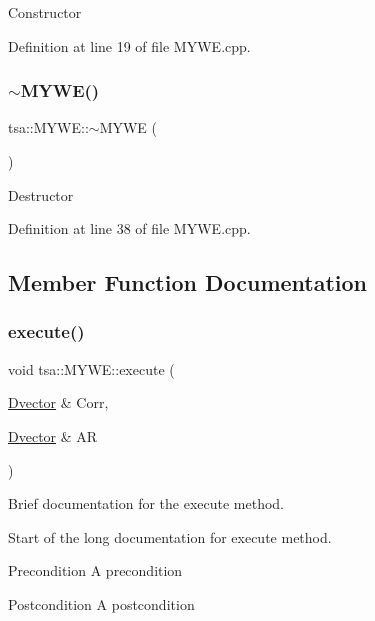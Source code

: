 Constructor 

Definition at line 19 of file M\+Y\+W\+E.\+cpp.

\mbox{\label{classtsa_1_1_m_y_w_e_a1bfa6dd78320a8606653346e2125e96a}} 
\subsubsection{\texorpdfstring{$\sim$\+M\+Y\+W\+E()}{~MYWE()}}
{\footnotesize\ttfamily tsa\+::\+M\+Y\+W\+E\+::$\sim$\+M\+Y\+WE (\begin{DoxyParamCaption}{ }\end{DoxyParamCaption})}

Destructor 

Definition at line 38 of file M\+Y\+W\+E.\+cpp.



\subsection{Member Function Documentation}
\mbox{\label{classtsa_1_1_m_y_w_e_a61f62c0f6070ccbfce9bd7edc137bf33}} 
\subsubsection{\texorpdfstring{execute()}{execute()}}
{\footnotesize\ttfamily void tsa\+::\+M\+Y\+W\+E\+::execute (\begin{DoxyParamCaption}\item[{\hyperlink{namespacetsa_a8900fb03d849baf447a1a0efe2561fb2}{Dvector} \&}]{Corr,  }\item[{\hyperlink{namespacetsa_a8900fb03d849baf447a1a0efe2561fb2}{Dvector} \&}]{AR }\end{DoxyParamCaption})}



Brief documentation for the execute method. 

Start of the long documentation for execute method.

\begin{DoxyPrecond}{Precondition}
A precondition 
\end{DoxyPrecond}
\begin{DoxyPostcond}{Postcondition}
A postcondition 
\end{DoxyPostcond}

